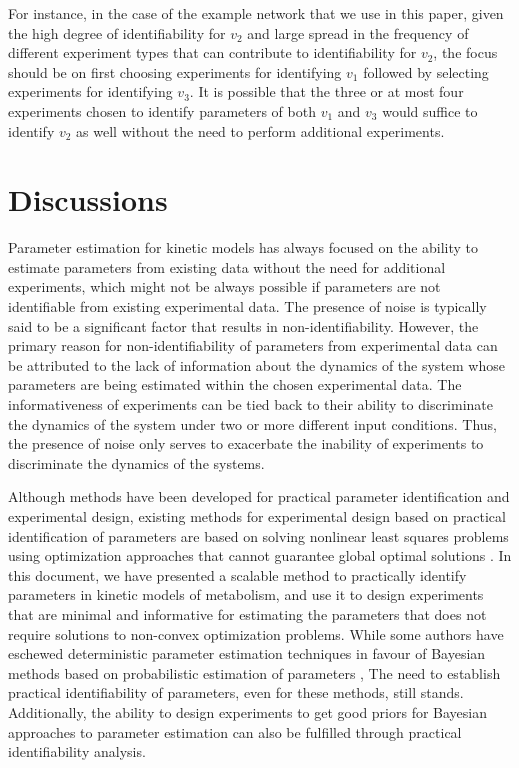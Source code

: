 \documentclass[10pt]{article}
\begin{document}
	For instance, in the case of the example network that we use in this paper, given the high degree of identifiability for $v_2$ and large spread in the frequency of different experiment types that can contribute to identifiability for $v_2$, the focus should be on first choosing experiments for identifying $v_1$ followed by selecting experiments for identifying $v_3$. It is possible that the three or at most four experiments chosen to identify parameters of both $v_1$ and $v_3$ would suffice to identify $v_2$ as well without the need to perform additional experiments.	
	
	\section{Discussions}\label{sec:discussion}	
	Parameter estimation for kinetic models has always focused on the ability to estimate parameters from existing data without the need for additional experiments, which might not be always possible if parameters are not identifiable from existing experimental data. The presence of noise is typically said to be a significant factor that results in non-identifiability. However, the primary reason for non-identifiability of parameters from experimental data can be attributed to the lack of information about the dynamics of the system whose parameters are being estimated within the chosen experimental data. The informativeness of experiments can be tied back to their ability to discriminate the dynamics of the system under two or more different input conditions. Thus, the presence of noise only serves to exacerbate the inability of experiments to discriminate the dynamics of the systems. 
	
	Although methods have been developed for practical parameter identification and experimental design, existing methods for experimental design based on practical identification of parameters are based on solving nonlinear least squares problems using optimization approaches that cannot guarantee global optimal solutions \parencite{Raue2009a}. In this document, we have presented a scalable method to practically identify parameters in kinetic models of metabolism, and use it to design experiments that are minimal and informative for estimating the parameters that does not require solutions to non-convex optimization problems. While some authors have eschewed deterministic parameter estimation techniques in favour of Bayesian methods based on probabilistic estimation of parameters \parencite{Saa2016, Saa2016a}, The need to establish practical identifiability of parameters, even for these methods, still stands. Additionally, the ability to design experiments to get good priors for Bayesian approaches to parameter estimation can also be fulfilled through practical identifiability analysis.
	
\end{document}

